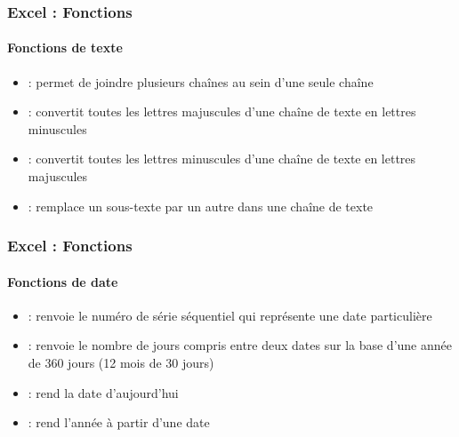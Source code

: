 \documentclass[xcolor=table, usenames,dvipsnames]{beamer}
\begin{document}
\begin{frame}
\frametitle{Excel : Fonctions}
\framesubtitle{Fonctions de texte}

\begin{minipage}{0.69\textwidth}
	\begin{itemize}
		\item {} : permet de joindre plusieurs chaînes au sein d’une seule chaîne
		\item {} : convertit toutes les lettres majuscules d'une chaîne de texte en lettres minuscules
		\item {} : convertit toutes les lettres minuscules d'une chaîne de texte en lettres majuscules
		\item {} : remplace un sous-texte par un autre dans une chaîne de texte
	\end{itemize}
\end{minipage}
%
\begin{minipage}{0.3\textwidth} 
	
\end{minipage}

\end{frame}

\begin{frame}
\frametitle{Excel : Fonctions}
\framesubtitle{Fonctions de date}

\begin{minipage}{0.69\textwidth}
	\begin{itemize}
		\item {} : renvoie le numéro de série séquentiel qui représente une date particulière
		\item {} : renvoie le nombre de jours compris entre deux dates sur la base d’une année de 360 jours (12 mois de 30 jours)
		\item {} : rend la date d'aujourd'hui
		\item {} : rend l'année à partir d'une date
	\end{itemize}
\end{minipage}
%
\begin{minipage}{0.3\textwidth} 
	
\end{minipage}

\end{frame}
\end{document}
